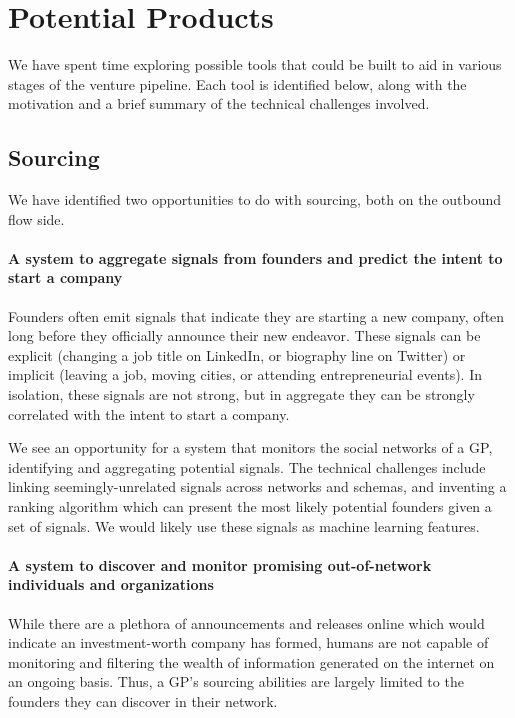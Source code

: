 \chapter{Potential Products}
\label{intro:products}

We have spent time exploring possible tools that could be built to aid in various stages of the venture pipeline. Each tool is identified below, along with the motivation and a brief summary of the technical challenges involved.

\section{Sourcing}

We have identified two opportunities to do with sourcing, both on the outbound flow side.

\subsubsection{A system to aggregate signals from founders and predict the intent to start a company}

Founders often emit signals that indicate they are starting a new company, often long before they officially announce their new endeavor. These signals can be explicit (changing a job title on LinkedIn, or biography line on Twitter) or implicit (leaving a job, moving cities, or attending entrepreneurial events). In isolation, these signals are not strong, but in aggregate they can be strongly correlated with the intent to start a company.

We see an opportunity for a system that monitors the social networks of a GP, identifying and aggregating potential signals. The technical challenges include linking seemingly-unrelated signals across networks and schemas, and inventing a ranking algorithm which can present the most likely potential founders given a set of signals. We would likely use these signals as machine learning features.

\subsubsection{A system to discover and monitor promising out-of-network individuals and organizations}

While there are a plethora of announcements and releases online which would indicate an investment-worth company has formed, humans are not capable of monitoring and filtering the wealth of information generated on the internet on an ongoing basis. Thus, a GP's sourcing abilities are largely limited to the founders they can discover in their network.

